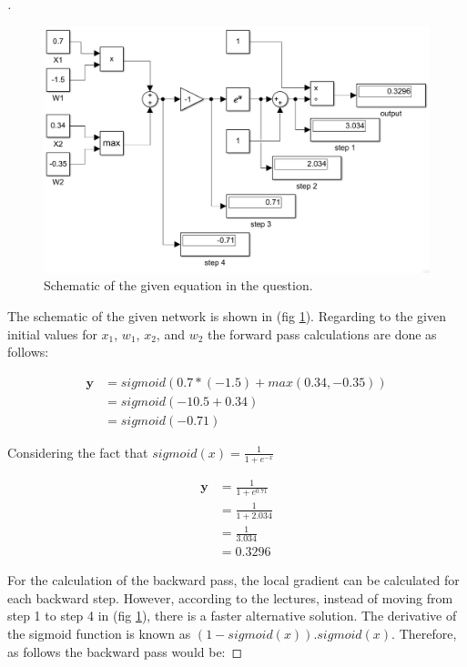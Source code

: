 \documentclass[12pt,oneside,geqno]{article}
\begin{document}
	\begin{proof}[\color{red}{Solution}]
		
		\begin{figure}
			\centering
			\includegraphics[width=\textwidth]{../figs/Q1_diagram.png}
			\caption{Schematic of the given equation in the question.}
			\label{img:net}
		\end{figure}
		
		The schematic of the given network is shown in (fig \ref{img:net}). Regarding to the given initial values for \(x_1\), \(w_1\), \(x_2\), and \(w_2\)  the forward pass calculations are done as follows:
		
		\begin{align}
			\mathbf{y} & = sigmoid(0.7 * (-1.5) + max(0.34, -0.35)) \\
			& = sigmoid(-10.5 + 0.34) \\
			& = sigmoid(-0.71)
		\end{align}
		
		Considering the fact that \(sigmoid(x)=\frac{1}{1 + e^{-x}}\)
		
		\begin{align}
			\mathbf{y} & = \frac{1}{1 + e^{0.71}} \\
			& = \frac{1}{1 + 2.034} \\
			& = \frac{1}{3.034} \\
			& = 0.3296
		\end{align}
		
		For the calculation of the backward pass, the local gradient can be calculated for each backward step. However, according to the lectures, instead of moving from step 1 to step 4 in (fig \ref{img:net}), there is a faster alternative solution. The derivative of the sigmoid function is known as \((1 - sigmoid(x)).sigmoid(x)\). Therefore, as follows the backward pass would be:
		

\end{proof}
\end{document}
